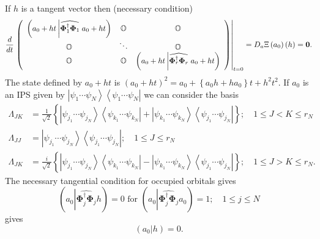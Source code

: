 \documentclass[aps,preprint]{revtex4}%
\begin{document}
If $h$ is a tangent vector then (necessary condition)
\begin{equation}
\frac{d}{dt}\left.  \left(
\begin{array}
[c]{ccc}%
\left(  a_{0}+ht\left\vert \widehat{\mathbf{\Phi}_{1}^{\dagger}\mathbf{\Phi
}_{1}}\right.  a_{0}+ht\right)  & \mathbb{O} & \mathbb{O}\\
\mathbb{O} & \ddots & \mathbb{O}\\
\mathbb{O} & \mathbb{O} & \left(  a_{0}+ht\left\vert \widehat{\mathbf{\Phi
}_{r}^{\dagger}\mathbf{\Phi}_{r}}\right.  a_{0}+ht\right)
\end{array}
\right)  \right\vert _{t=0}=D_{a}\Xi\left(  a_{0}\right)  \left(  h\right)
=\mathbf{0.}%
\end{equation}
The state defined by $a_{0}+ht$ is $\left(  a_{0}+ht\right)  ^{2}%
=a_{0}+\left\{  a_{0}h+ha_{0}\right\}  t+h^{2}t^{2}$. If $a_{0}$ is an IPS
given by $\left\vert \psi_{1}\cdots\psi_{N}\right\rangle \left\langle \psi
_{1}\cdots\psi_{N}\right\vert $ we can consider the basis
\begin{align}
\Lambda_{JK}  &  =\frac{1}{\sqrt{2}}\left\{  \left\vert \psi_{j_{1}}\cdots
\psi_{j_{N}}\right\rangle \left\langle \psi_{k_{1}}\cdots\psi_{k_{N}%
}\right\vert +\left\vert \psi_{k_{1}}\cdots\psi_{k_{N}}\right\rangle
\left\langle \psi_{j_{1}}\cdots\psi_{j_{N}}\right\vert \right\}  ;\quad1\leq
J<K\leq r_{N}\nonumber\\
\Lambda_{JJ}  &  =\left\vert \psi_{j_{1}}\cdots\psi_{j_{N}}\right\rangle
\left\langle \psi_{j_{1}}\cdots\psi_{j_{N}}\right\vert ;\quad1\leq J\leq
r_{N}\nonumber\\
\Lambda_{JK}  &  =\frac{i}{\sqrt{2}}\left\{  \left\vert \psi_{j_{1}}\cdots
\psi_{j_{N}}\right\rangle \left\langle \psi_{k_{1}}\cdots\psi_{k_{N}%
}\right\vert -\left\vert \psi_{k_{1}}\cdots\psi_{k_{N}}\right\rangle
\left\langle \psi_{j_{1}}\cdots\psi_{j_{N}}\right\vert \right\}  ;\quad1\leq
J>K\leq r_{N}. \label{basis}%
\end{align}
The necessary tangential condition for occupied orbitals gives
\begin{equation}
\left(  a_{0}\left\vert \widehat{\mathbf{\Phi}_{j}^{\dagger}\mathbf{\Phi}_{j}%
}\right.  h\right)  =0\text{ for }\left(  a_{0}\left\vert \widehat
{\mathbf{\Phi}_{j}^{\dagger}\mathbf{\Phi}_{j}}\right.  a_{0}\right)
=1;\quad1\leq j\leq N
\end{equation}
gives
\begin{equation}
\left(  a_{0}\left\vert h\right.  \right)  =0.
\end{equation}
\end{document}
